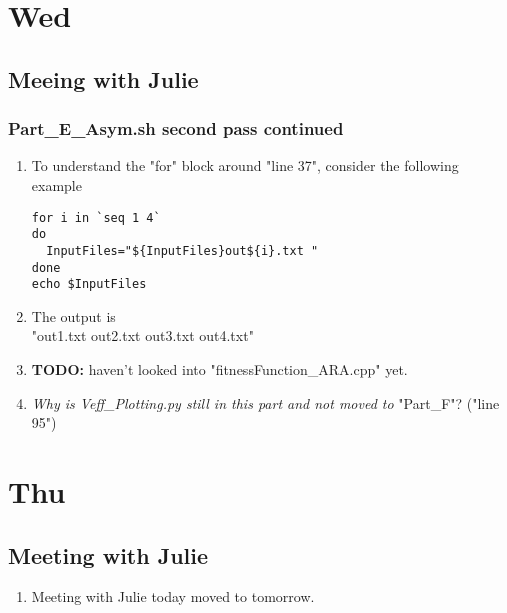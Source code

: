 \documentclass[12pt,letterpaper]{article}
\begin{document}
\section{Wed}
\subsection{Meeing with Julie}
\subsubsection{Part\_E\_Asym.sh second pass continued}
\begin{enumerate}
  \item To understand the "for" block around "line 37", consider the following example
    \begin{verbatim}
for i in `seq 1 4`
do
  InputFiles="${InputFiles}out${i}.txt "
done
echo $InputFiles
    \end{verbatim}

  \item The output is \\
    "out1.txt out2.txt out3.txt out4.txt"
  \item \textbf{TODO:} haven't looked into "fitnessFunction_ARA.cpp" yet.
  \item \textit{Why is Veff\_Plotting.py still in this part and not moved to} "Part_F"?
    ("line 95")
\end{enumerate}

\section{Thu}
\subsection{Meeting with Julie}
\begin{enumerate}
  \item Meeting with Julie today moved to tomorrow.
\end{enumerate}
\end{document}
